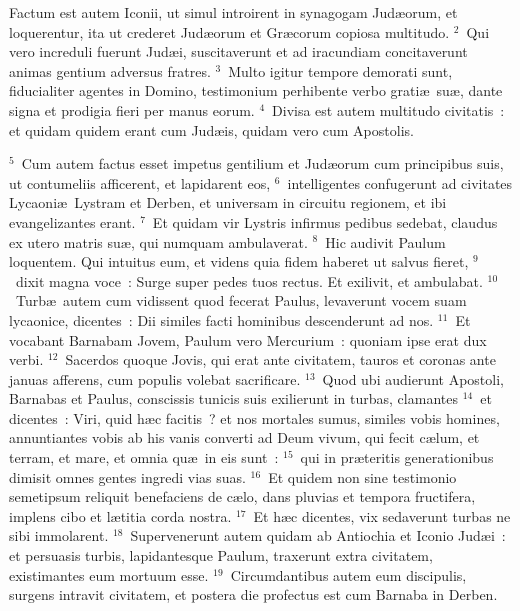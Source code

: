 \lettrine[lines=3,image=true,loversize=0.05,lraise=-0.03]{F}{}actum est autem Iconii, ut simul introirent in synagogam Jud\ae orum, et loquerentur, ita ut crederet Jud\ae orum et Gr\ae corum copiosa multitudo.
${}^{2}$~Qui vero increduli fuerunt Jud\ae i, suscitaverunt et ad iracundiam concitaverunt animas gentium adversus fratres.
${}^{3}$~Multo igitur tempore demorati sunt, fiducialiter agentes in Domino, testimonium perhibente verbo grati\ae\ su\ae , dante signa et prodigia fieri per manus eorum.
${}^{4}$~Divisa est autem multitudo civitatis~: et quidam quidem erant cum Jud\ae is, quidam vero cum Apostolis.


${}^{5}$~Cum autem factus esset impetus gentilium et Jud\ae orum cum principibus suis, ut contumeliis afficerent, et lapidarent eos,
${}^{6}$~intelligentes confugerunt ad civitates Lycaoni\ae\ Lystram et Derben, et universam in circuitu regionem, et ibi evangelizantes erant.
${}^{7}$~Et quidam vir Lystris infirmus pedibus sedebat, claudus ex utero matris su\ae , qui numquam ambulaverat.
${}^{8}$~Hic audivit Paulum loquentem. Qui intuitus eum, et videns quia fidem haberet ut salvus fieret,
${}^{9}$~dixit magna voce~: Surge super pedes tuos rectus. Et exilivit, et ambulabat.
${}^{10}$~Turb\ae\ autem cum vidissent quod fecerat Paulus, levaverunt vocem suam lycaonice, dicentes~: Dii similes facti hominibus descenderunt ad nos.
${}^{11}$~Et vocabant Barnabam Jovem, Paulum vero Mercurium~: quoniam ipse erat dux verbi.
${}^{12}$~Sacerdos quoque Jovis, qui erat ante civitatem, tauros et coronas ante januas afferens, cum populis volebat sacrificare.
${}^{13}$~Quod ubi audierunt Apostoli, Barnabas et Paulus, conscissis tunicis suis exilierunt in turbas, clamantes
${}^{14}$~et dicentes~: Viri, quid h\ae c facitis~? et nos mortales sumus, similes vobis homines, annuntiantes vobis ab his vanis converti ad Deum vivum, qui fecit c\ae lum, et terram, et mare, et omnia qu\ae\ in eis sunt~:
${}^{15}$~qui in pr\ae teritis generationibus dimisit omnes gentes ingredi vias suas.
${}^{16}$~Et quidem non sine testimonio semetipsum reliquit benefaciens de c\ae lo, dans pluvias et tempora fructifera, implens cibo et l\ae titia corda nostra.
${}^{17}$~Et h\ae c dicentes, vix sedaverunt turbas ne sibi immolarent.
${}^{18}$~Supervenerunt autem quidam ab Antiochia et Iconio Jud\ae i~: et persuasis turbis, lapidantesque Paulum, traxerunt extra civitatem, existimantes eum mortuum esse.
${}^{19}$~Circumdantibus autem eum discipulis, surgens intravit civitatem, et postera die profectus est cum Barnaba in Derben.


